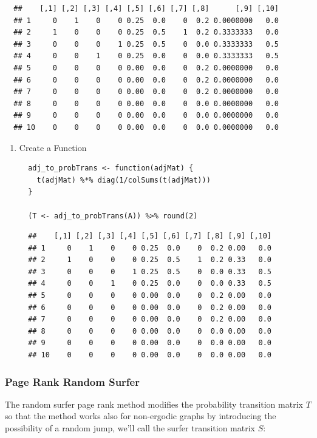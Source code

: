 \documentclass[11pt]{article}
\begin{document}
\begin{enumerate}
\begin{verbatim}
  ##    [,1] [,2] [,3] [,4] [,5] [,6] [,7] [,8]      [,9] [,10]
  ## 1     0    1    0    0 0.25  0.0    0  0.2 0.0000000   0.0
  ## 2     1    0    0    0 0.25  0.5    1  0.2 0.3333333   0.0
  ## 3     0    0    0    1 0.25  0.5    0  0.0 0.3333333   0.5
  ## 4     0    0    1    0 0.25  0.0    0  0.0 0.3333333   0.5
  ## 5     0    0    0    0 0.00  0.0    0  0.2 0.0000000   0.0
  ## 6     0    0    0    0 0.00  0.0    0  0.2 0.0000000   0.0
  ## 7     0    0    0    0 0.00  0.0    0  0.2 0.0000000   0.0
  ## 8     0    0    0    0 0.00  0.0    0  0.0 0.0000000   0.0
  ## 9     0    0    0    0 0.00  0.0    0  0.0 0.0000000   0.0
  ## 10    0    0    0    0 0.00  0.0    0  0.0 0.0000000   0.0
\end{verbatim}

\begin{enumerate}
\item Create a Function
\label{create-a-function}
\lstset{language=r,label= ,caption= ,captionpos=b,numbers=none}
\begin{lstlisting}
  adj_to_probTrans <- function(adjMat) {
    t(adjMat) %*% diag(1/colSums(t(adjMat)))
  }

  (T <- adj_to_probTrans(A)) %>% round(2)
\end{lstlisting}

\begin{verbatim}
  ##    [,1] [,2] [,3] [,4] [,5] [,6] [,7] [,8] [,9] [,10]
  ## 1     0    1    0    0 0.25  0.0    0  0.2 0.00   0.0
  ## 2     1    0    0    0 0.25  0.5    1  0.2 0.33   0.0
  ## 3     0    0    0    1 0.25  0.5    0  0.0 0.33   0.5
  ## 4     0    0    1    0 0.25  0.0    0  0.0 0.33   0.5
  ## 5     0    0    0    0 0.00  0.0    0  0.2 0.00   0.0
  ## 6     0    0    0    0 0.00  0.0    0  0.2 0.00   0.0
  ## 7     0    0    0    0 0.00  0.0    0  0.2 0.00   0.0
  ## 8     0    0    0    0 0.00  0.0    0  0.0 0.00   0.0
  ## 9     0    0    0    0 0.00  0.0    0  0.0 0.00   0.0
  ## 10    0    0    0    0 0.00  0.0    0  0.0 0.00   0.0
\end{verbatim}
\end{enumerate}
\end{enumerate}

\subsubsection{Page Rank Random Surfer}
\label{page-rank-random-surfer}
The random surfer page rank method modifies the probability transition
matrix \(T\) so that the method works also for non-ergodic graphs by
introducing the possibility of a random jump, we'll call the surfer
transition matrix \(S\):
\end{document}
